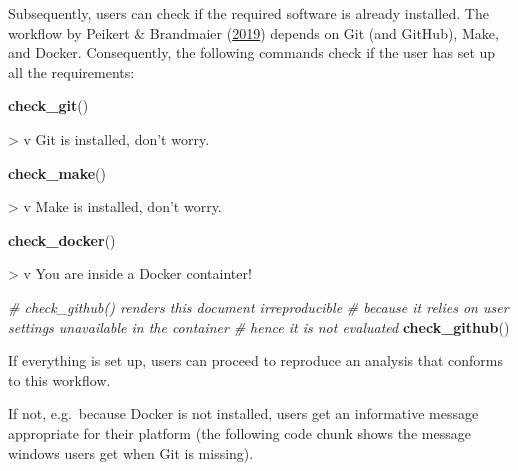 \documentclass[12pt,a4paper,twoside]{article}
\newenvironment{Shaded}{\begin{snugshade}}{\end{snugshade}}
\newcommand{\CommentTok}[1]{\textcolor[rgb]{0.56,0.35,0.01}{\textit{#1}}}
\newcommand{\KeywordTok}[1]{\textcolor[rgb]{0.13,0.29,0.53}{\textbf{#1}}}
\newcommand{\NormalTok}[1]{#1}
\let\oldverbatim\verbatim
\let\endoldverbatim\endverbatim
\renewenvironment{verbatim}{\footnotesize\oldverbatim}{\endoldverbatim}
\begin{document}
Subsequently, users can check if the required software is already installed.
The workflow by Peikert \& Brandmaier (\protect\hyperlink{ref-peikertReproducibleDataAnalysis2019}{2019}) depends on Git (and GitHub), Make, and Docker.
Consequently, the following commands check if the user has set up all the requirements:

\begin{Shaded}
\begin{Highlighting}[]
\KeywordTok{check_git}\NormalTok{()}
\end{Highlighting}
\end{Shaded}

\begin{verbatim}
> v Git is installed, don't worry.
\end{verbatim}

\begin{Shaded}
\begin{Highlighting}[]
\KeywordTok{check_make}\NormalTok{()}
\end{Highlighting}
\end{Shaded}

\begin{verbatim}
> v Make is installed, don't worry.
\end{verbatim}

\begin{Shaded}
\begin{Highlighting}[]
\KeywordTok{check_docker}\NormalTok{()}
\end{Highlighting}
\end{Shaded}

\begin{verbatim}
> v You are inside a Docker containter!
\end{verbatim}

\begin{Shaded}
\begin{Highlighting}[]
\CommentTok{# check_github() renders this document irreproducible}
\CommentTok{# because it relies on user settings unavailable in the container}
\CommentTok{# hence it is not evaluated}
\KeywordTok{check_github}\NormalTok{()}
\end{Highlighting}
\end{Shaded}

If everything is set up, users can proceed to reproduce an analysis that conforms to this workflow.

If not, e.g.~because Docker is not installed, users get an informative message appropriate for their platform (the following code chunk shows the message windows users get when Git is missing).
\end{document}
